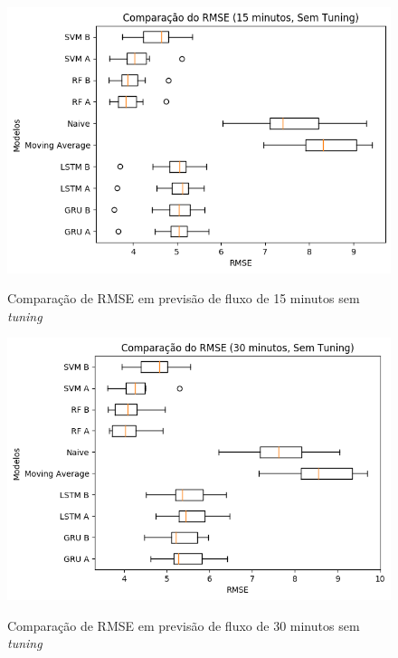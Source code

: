 \label{attachment:comparisons}

\begin{figure}[htbp]
    \centering
    \includegraphics[scale=0.8]{monography/img/snapshots/comparacao_do_rmse_(15_minutos,_sem_tuning)_performance_boxes.png}
    \label{figure:comparacao_previsao_rmse_15_sem_tuning}
    \caption{Comparação de RMSE em previsão de fluxo de 15 minutos sem \textit{tuning}}
\end{figure}

\begin{figure}[htbp]
    \centering
    \includegraphics[scale=0.8]{monography/img/snapshots/comparacao_do_rmse_(30_minutos,_sem_tuning)_performance_boxes.png}
    \label{figure:comparacao_previsao_rmse_30_sem_tuning}
    \caption{Comparação de RMSE em previsão de fluxo de 30 minutos sem \textit{tuning}}
\end{figure}


